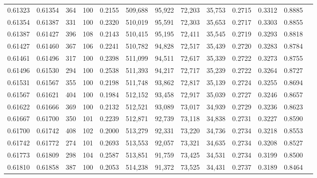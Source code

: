 \begin{tabular}{rrrrrrrrrrrrr}
0.61323 & 0.61354 &   364 & 100 &                                     0.2155 & 509,688 &  95,922 &  72,203 &  35,753 & 0.2715 & 0.3312 & 0.8885 \\
0.61354 & 0.61387 &   331 & 100 &                                     0.2320 & 510,019 &  95,591 &  72,303 &  35,653 & 0.2717 & 0.3303 & 0.8855 \\
0.61387 & 0.61427 &   396 & 108 &                                     0.2143 & 510,415 &  95,195 &  72,411 &  35,545 & 0.2719 & 0.3293 & 0.8818 \\
0.61427 & 0.61460 &   367 & 106 &                                     0.2241 & 510,782 &  94,828 &  72,517 &  35,439 & 0.2720 & 0.3283 & 0.8784 \\
0.61461 & 0.61496 &   317 & 100 &                                     0.2398 & 511,099 &  94,511 &  72,617 &  35,339 & 0.2722 & 0.3273 & 0.8755 \\
0.61496 & 0.61530 &   294 & 100 &                                     0.2538 & 511,393 &  94,217 &  72,717 &  35,239 & 0.2722 & 0.3264 & 0.8727 \\
0.61531 & 0.61567 &   355 & 100 &                                     0.2198 & 511,748 &  93,862 &  72,817 &  35,139 & 0.2724 & 0.3255 & 0.8694 \\
0.61567 & 0.61621 &   404 & 100 &                                     0.1984 & 512,152 &  93,458 &  72,917 &  35,039 & 0.2727 & 0.3246 & 0.8657 \\
0.61622 & 0.61666 &   369 & 100 &                                     0.2132 & 512,521 &  93,089 &  73,017 &  34,939 & 0.2729 & 0.3236 & 0.8623 \\
0.61667 & 0.61700 &   350 & 101 &                                     0.2239 & 512,871 &  92,739 &  73,118 &  34,838 & 0.2731 & 0.3227 & 0.8590 \\
0.61700 & 0.61742 &   408 & 102 &                                     0.2000 & 513,279 &  92,331 &  73,220 &  34,736 & 0.2734 & 0.3218 & 0.8553 \\
0.61742 & 0.61772 &   274 & 101 &                                     0.2693 & 513,553 &  92,057 &  73,321 &  34,635 & 0.2734 & 0.3208 & 0.8527 \\
0.61773 & 0.61809 &   298 & 104 &                                     0.2587 & 513,851 &  91,759 &  73,425 &  34,531 & 0.2734 & 0.3199 & 0.8500 \\
0.61810 & 0.61858 &   387 & 100 &                                     0.2053 & 514,238 &  91,372 &  73,525 &  34,431 & 0.2737 & 0.3189 & 0.8464 \\

\end{tabular}
